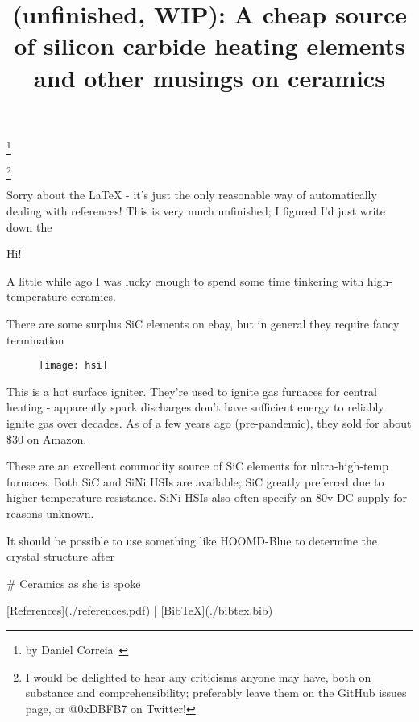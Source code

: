 \documentclass[fleqn,10pt]{article}
\title{(unfinished, WIP): A cheap source of silicon carbide heating elements and other musings on ceramics}
\date{}
\begin{document}
\maketitle


\footnote{by \small{{Daniel Correia}\ }}

\footnote{{I would be delighted to hear any criticisms anyone may have, both on substance and comprehensibility; preferably leave them on the GitHub issues page, or @0xDBFB7 on Twitter!}}


Sorry about the LaTeX - it's just the only reasonable way of automatically dealing with references! This is very much unfinished; I figured I'd just write down the 

Hi!

A little while ago I was lucky enough to spend some time tinkering with high-temperature ceramics.



\begin{figure}[H]
	\centering
	


\end{figure}


There are some surplus SiC elements on ebay, but in general they require fancy termination 

\begin{figure}[H]
	\centering

		\texttt{[image: hsi]}
	
	
\end{figure}

This is a hot surface igniter. They're used to ignite gas furnaces for central heating - apparently spark discharges don't have sufficient energy to reliably ignite gas over decades. As of a few years ago (pre-pandemic), they sold for about \$30 on Amazon.

These are an excellent commodity source of SiC elements for ultra-high-temp furnaces. Both SiC and SiNi HSIs are available; SiC greatly preferred due to higher temperature resistance. SiNi HSIs also often specify an 80v DC supply for reasons unknown.



It should be possible to use something like HOOMD-Blue to determine the crystal structure after 

# Ceramics as she is spoke

[References](./references.pdf) | [BibTeX](./bibtex.bib) 
\end{document}
